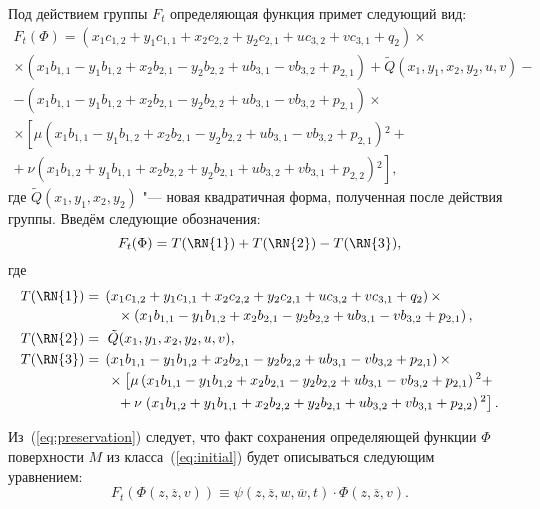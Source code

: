 \documentclass[../main.tex]{subfiles}
\begin{document}
Под действием группы $F_t$ определяющая функция примет следующий вид:
\begin{multline*}
F_t(\Phi) = \left(x_1 c_{1,2}+y_1 c_{1,1}+x_2 c_{2,2}+y_2 c_{2,1} + u c_{3,2}+v c_{3,1}+q_2\right) \times \\ 
\times \left(x_1 b_{1,1}-y_1 b_{1,2}+x_2 b_{2,1}-y_2 b_{2,2} + u b_{3,1}-v b_{3,2}+p_{2,1}\right) + \tilde{Q}(x_1,y_1,x_2,y_2,u,v) - \\
-\left(x_1 b_{1,1}-y_1 b_{1,2}+x_2 b_{2,1}-y_2 b_{2,2}+ u b_{3,1}-v b_{3,2}+p_{2,1}\right) \times \\
\times \left[\mu  \left(x_1 b_{1,1}-y_1 b_{1,2}+x_2 b_{2,1}-y_2 b_{2,2} + u b_{3,1}-v b_{3,2}+p_{2,1}\right){}^2 + \right. \\ 
+ \ \left. \nu \left(x_1 b_{1,2}+y_1 b_{1,1}+x_2 b_{2,2}+y_2 b_{2,1} + u b_{3,2}+v b_{3,1} + p_{2,2}\right){}^2 \right],
\end{multline*}
где $\tilde{Q}(x_1, y_1, x_2, y_2)$ "--- новая квадратичная форма, полученная после действия группы. Введём следующие обозначения:
\[
F_t(\Phi) = T(\mathrm{\RN{1}}) + T(\mathrm{\RN{2}}) - T(\mathrm{\RN{3}}),
\]
где 
\begin{align*}
T(\mathrm{\RN{1}}) &= 
\begin{multlined}[t]
\left(x_1 c_{1,2}+y_1 c_{1,1}+x_2 c_{2,2}+y_2 c_{2,1} + u c_{3,2}+v c_{3,1}+q_2\right) \times \\ 
\times \left(x_1 b_{1,1}-y_1 b_{1,2}+x_2 b_{2,1}-y_2 b_{2,2} + u b_{3,1}-v b_{3,2}+p_{2,1}\right),
\end{multlined}\\
T(\mathrm{\RN{2}}) &= 
\begin{multlined}[t]
\ \tilde{Q}(x_1,y_1,x_2,y_2,u,v),
\end{multlined}\\
T(\mathrm{\RN{3}}) &= 
\begin{multlined}[t]
\left(x_1 b_{1,1}-y_1 b_{1,2}+x_2 b_{2,1}-y_2 b_{2,2} + u b_{3,1}-v b_{3,2} + p_{2,1}\right) \times \\
\times \left[\mu  \left(x_1 b_{1,1}-y_1 b_{1,2}+x_2 b_{2,1}-y_2 b_{2,2} + u b_{3,1}-v b_{3,2}+p_{2,1}\right){}^2 + \right. \\ 
+ \nu \left. \left(x_1 b_{1,2}+y_1 b_{1,1}+x_2 b_{2,2}+y_2 b_{2,1} + u b_{3,2}+v b_{3,1} + p_{2,2}\right){}^2 \right].
\end{multlined}
\end{align*}

Из~(\ref{eq:preservation}) следует, что факт сохранения определяющей функции $\Phi$ поверхности $M$ из класса~(\ref{eq:initial}) будет описываться следующим уравнением:
\begin{equation}\label{eq:preservation_m}
F_t\left(\Phi(z, \overline{z}, v)\right) \equiv \psi(z, \overline{z}, w, \overline{w}, t) \cdot \Phi(z, \overline{z}, v). 
\end{equation}
\end{document}
